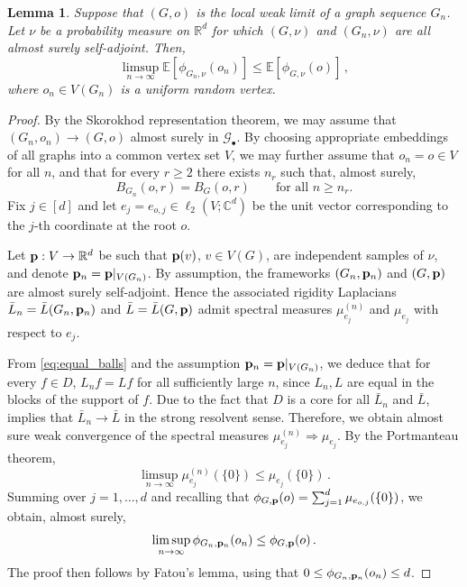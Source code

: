 \documentclass[10pt,a4paper]{amsart}
\numberwithin{equation}{section}
\newtheorem{lemma}[theorem]{Lemma}
\newcommand{\E}{\mathbb E}
\newcommand{\R}{\mathbb R}
\newcommand{\C}{\mathbb C}
\newcommand{\cG}{\mathcal G}
\newcommand{\p}{{\bf p}}
\begin{document}
\begin{lemma}\label{lem:upper_semi}
    Suppose that $(G,o)$ is the local weak limit of a graph sequence $G_n$. Let $\nu$ be a probability measure on $\R^d$ for which $(G,\nu)$ and $(G_n,\nu)$ are all almost surely self-adjoint. Then,
    \[
        \limsup_{n\to\infty}\E[\phi_{G_n,\nu}(o_n)]\le \E[\phi_{G,\nu}(o)]\,,
    \]
    where $o_n\in V(G_n)$ is a uniform random vertex.
\end{lemma}
\begin{proof}
     By the Skorokhod representation theorem, we may assume that $(G_n,o_n)\to (G,o)$ almost surely in $\cG_\bullet$. By choosing appropriate embeddings of all graphs into a common vertex set $V$, we may further assume that $o_n=o\in V$ for all $n$, and that for every $r\ge 2$ there exists $n_r$ such that, almost surely,
    \begin{equation}\label{eq:equal_balls}
    B_{G_n}(o,r)=B_G(o,r)\qquad\text{for all } n\ge n_r.
    \end{equation}
    Fix $j\in[d]$ and let $e_j = e_{o,j}\in\ell_2(V;\C^d)$ be the unit vector corresponding to the $j$-th coordinate at the root $o$.

    Let $\p:V\to \R^d$ be such that $\p(v)$, $v\in V(G)$, are independent samples of $\nu$, and denote $\p_n=\p|_{V(G_n)}$.
    By assumption, the frameworks $(G_n,\p_n)$ and $(G,\p)$ are almost surely self-adjoint. Hence the associated rigidity Laplacians $\bar L_n = \bar L(G_n,\p_n)$ and $\bar L = \bar L(G,\p)$ admit spectral measures $\mu^{(n)}_{e_{j}}$ and $\mu_{e_{j}}$ with respect to $e_{j}$.

From \eqref{eq:equal_balls} and the assumption $\p_n=\p|_{V(G_n)}$, we deduce that for every \(f\in D\), \(L_n f=Lf\) for all sufficiently large \(n\),
since $L_n,L$ are equal in the blocks of the support of $f$. 
Due to the fact that \(D\) is a core for all \(\bar L_n\) and \(\bar L\), \cite[Theorem VIII.25(a)]{ReedSimonI} implies that \(\bar L_n\to \bar L\) in the strong resolvent sense. Therefore, we obtain almost sure weak convergence of the spectral measures $\mu^{(n)}_{e_{j}}\Rightarrow \mu_{e_{j}}$. By the Portmanteau theorem,
    \[
        \limsup_{n\to\infty}\mu^{(n)}_{e_{j}}(\{0\})\le \mu_{e_{j}}(\{0\})\,.
    \]
    Summing over $j=1,\dots,d$ and recalling that $\phi_{G,\p}(o)=\sum_{j=1}^d \mu_{e_{o,j}}(\{0\})$, we obtain, almost surely,
    \[
        \limsup_{n\to\infty}\phi_{G_n,\p_n}(o_n)\le \phi_{G,\p}(o)\,.
    \]
    The proof then follows by Fatou's lemma, using that $0\le \phi_{G_n,\p_n}(o_n)\le d$.
\end{proof}
\end{document}

